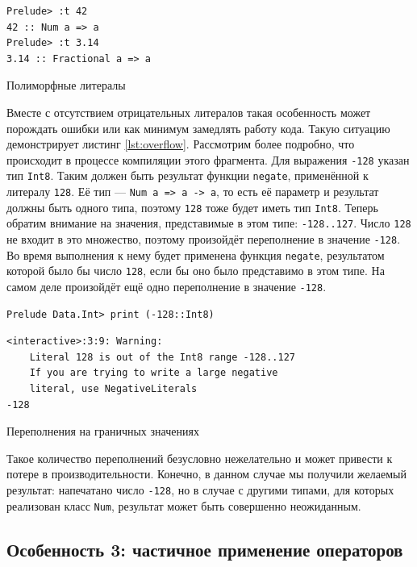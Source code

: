 \begin{ListingEnv}[H]
\begin{lstlisting}
Prelude> :t 42
42 :: Num a => a
Prelude> :t 3.14
3.14 :: Fractional a => a
\end{lstlisting}
\caption{Полиморфные литералы}
\label{lst:types}
\end{ListingEnv}

Вместе с отсутствием отрицательных литералов такая особенность может порождать
ошибки или как минимум замедлять работу кода. Такую ситуацию демонстрирует
листинг \ref{lst:overflow}. Рассмотрим более подробно, что происходит в
процессе компиляции этого фрагмента. Для выражения \texttt{-128} указан тип
\texttt{Int8}. Таким должен быть результат функции \texttt{negate}, применённой
к литералу \texttt{128}. Её тип --- \texttt{Num a => a -> a}, то есть её
параметр и результат должны быть одного типа, поэтому \texttt{128} тоже будет
иметь тип \texttt{Int8}. Теперь обратим внимание на значения, представимые в
этом типе: \texttt{-128..127}. Число \texttt{128} не входит в это множество,
поэтому произойдёт переполнение в значение \texttt{-128}.  Во время выполнения
к нему будет применена функция \texttt{negate}, результатом которой было бы
число \texttt{128}, если бы оно было представимо в этом типе.  На самом деле
произойдёт ещё одно переполнение в значение \texttt{-128}.

\begin{ListingEnv}[H]
\begin{lstlisting}
Prelude Data.Int> print (-128::Int8)
\end{lstlisting}
\begin{verbatim}
<interactive>:3:9: Warning:
    Literal 128 is out of the Int8 range -128..127
    If you are trying to write a large negative
    literal, use NegativeLiterals
-128
\end{verbatim}
\caption{Переполнения на граничных значениях}
\label{lst:overflow}
\end{ListingEnv}

Такое количество переполнений безусловно нежелательно и может привести к потере
в производительности. Конечно, в данном случае мы получили желаемый результат:
напечатано число \texttt{-128}, но в случае с другими типами, для которых
реализован класс \texttt{Num}, результат может быть совершенно неожиданным.

\subsection{Особенность 3: частичное применение операторов}

